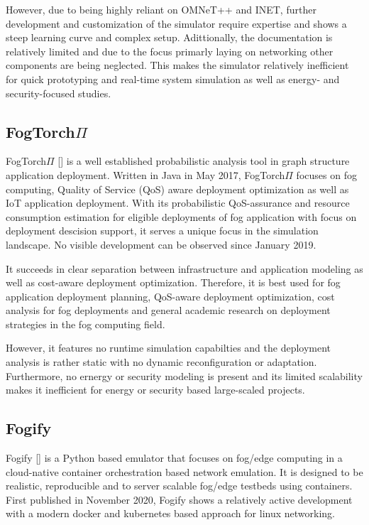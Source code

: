 However, due to being highly reliant on OMNeT++ and INET, further development and customization of the simulator require expertise and shows a steep learning curve and complex setup.
Adittionally, the documentation is relatively limited and due to the focus primarly laying on networking other components are being neglected.
This makes the simulator relatively inefficient for quick prototyping and real-time system simulation as well as energy- and security-focused studies.

\subsection{FogTorch$\Pi$}
FogTorch$\Pi$ [\cite{sim-fogtorchpi}] is a well established probabilistic analysis tool in graph structure application deployment.
Written in Java in May 2017, FogTorch$\Pi$ focuses on fog computing, Quality of Service (QoS) aware deployment optimization as well as IoT application deployment.
With its probabilistic QoS-assurance and resource consumption estimation for eligible deployments of fog application with focus on deployment descision support, it serves a unique focus in the simulation landscape.
No visible development can be observed since January 2019.

It succeeds in clear separation between infrastructure and application modeling as well as cost-aware deployment optimization.
Therefore, it is best used for fog application deployment planning, QoS-aware deployment optimization, cost analysis for fog deployments and general academic research on deployment strategies in the fog computing field.

However, it features no runtime simulation capabilties and the deployment analysis is rather static with no dynamic reconfiguration or adaptation.
Furthermore, no ernergy or security modeling is present and its limited scalability makes it inefficient for energy or security based large-scaled projects.
\subsection{Fogify}
Fogify [\cite{sim-fogify}] is a Python based emulator that focuses on fog/edge computing in a cloud-native container orchestration based network emulation.
It is designed to be realistic, reproducible and to server scalable fog/edge testbeds using containers.
First published in November 2020, Fogify shows a relatively active development with a modern docker and kubernetes based approach for linux networking.

